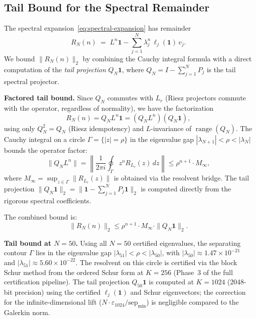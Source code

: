 \documentclass[11pt]{article}
\begin{document}
\clearpage
\subsection*{Tail Bound for the Spectral Remainder}

The spectral expansion~\eqref{eq:spectral-expansion} has remainder
\[
R_N(n) \;=\; L^n \mathbf{1} - \sum_{j=1}^{N} \lambda_j^n \, \ell_j(\mathbf{1}) \, v_j.
\]
We bound $\|R_N(n)\|_2$ by combining the Cauchy integral formula with a
direct computation of the \emph{tail projection} $Q_N \mathbf{1}$, where
$Q_N = I - \sum_{j=1}^N P_j$ is the tail spectral projector.

\medskip\noindent
\textbf{Factored tail bound.}
Since $Q_N$ commutes with $L_r$ (Riesz projectors commute with the operator,
regardless of normality), we have the factorization
\[
R_N(n) = Q_N L^n \mathbf{1} = (Q_N L^n)(Q_N \mathbf{1}),
\]
using only $Q_N^2 = Q_N$ (Riesz idempotency) and $L$-invariance of $\operatorname{range}(Q_N)$.
The Cauchy integral on a circle $\Gamma = \{|z| = \rho\}$ in the eigenvalue gap
$|\lambda_{N+1}| < \rho < |\lambda_N|$ bounds the operator factor:
\[
\|Q_N L^n\| = \left\|\frac{1}{2\pi i} \oint_\Gamma z^n R_{L_r}(z)\,dz\right\|
\leq \rho^{n+1} \cdot M_\infty,
\]
where $M_\infty = \sup_{z\in\Gamma} \|R_{L_r}(z)\|$ is obtained via the resolvent bridge.
The tail projection $\|Q_N \mathbf{1}\|_2 = \|\mathbf{1} - \sum_{j=1}^N P_j \mathbf{1}\|_2$
is computed directly from the rigorous spectral coefficients.

The combined bound is:
\[
\boxed{\|R_N(n)\|_2 \leq \rho^{n+1} \cdot M_\infty \cdot \|Q_N \mathbf{1}\|_2.}
\]

\medskip\noindent
\textbf{Tail bound at $N = 50$.}
Using all $N = 50$ certified eigenvalues, the separating contour $\Gamma$ lies
in the eigenvalue gap $|\lambda_{51}| < \rho < |\lambda_{50}|$,
with $|\lambda_{50}| \approx 1.47 \times 10^{-21}$ and
$|\lambda_{51}| \approx 5.60 \times 10^{-22}$.
The resolvent on this circle is certified via the block Schur
method from the ordered Schur form at $K = 256$
(Phase~3 of the full certification pipeline).
The tail projection $Q_{50}\mathbf{1}$ is computed at $K = 1024$
(2048-bit precision) using the certified $\ell_j(\mathbf{1})$ and Schur eigenvectors;
the correction for the infinite-dimensional lift ($N \cdot \varepsilon_{1024} / \mathrm{sep}_{\min}$)
is negligible compared to the Galerkin norm.
\end{document}
